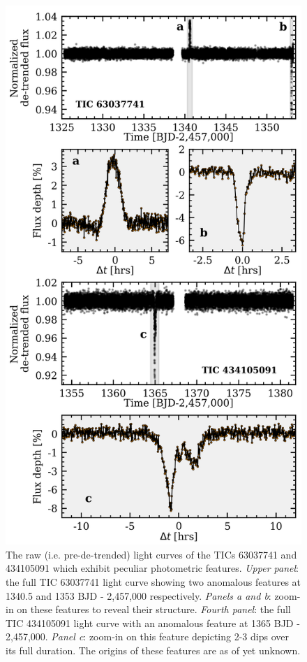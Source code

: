 \begin{figure}
  \centering
  \includegraphics[width=0.6\hsize]{figures/wtfLCs.png}
  \caption[The exotic light curves of TICs 63037741 and 434105091.]
      {The raw (i.e. pre-de-trended)
    light curves of the TICs 63037741 and 434105091 which exhibit peculiar
    photometric features. \emph{Upper panel}: the full TIC 63037741 light curve
    showing two anomalous features at 1340.5 and 1353 BJD - 2,457,000 respectively. \emph{Panels a and b}:
    zoom-in on these features to reveal their structure. \emph{Fourth panel}: the full TIC 434105091
    light curve with an anomalous feature at 1365 BJD - 2,457,000. \emph{Panel c}: zoom-in on this
    feature depicting 2-3 dips over its full duration. The origins of these features are as of
    yet unknown.}
  \label{fig:wtf}
\end{figure}


